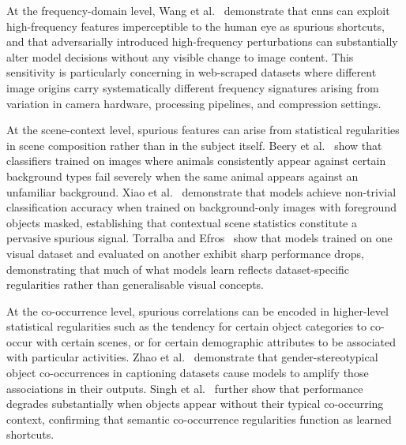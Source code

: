 At the frequency-domain level, Wang et al.~\cite{Wang_2020_HighFrequencyComponentHelpsExplainTheGeneralizationOfCNN} demonstrate that \acrshort{cnn}s can exploit high-frequency features imperceptible to the human eye as spurious shortcuts, and that adversarially introduced high-frequency perturbations can substantially alter model decisions without any visible change to image content. This sensitivity is particularly concerning in web-scraped datasets where different image origins carry systematically different frequency signatures arising from variation in camera hardware, processing pipelines, and compression settings.

At the scene-context level, spurious features can arise from statistical
regularities in scene composition rather than in the subject itself. Beery et
al.~\cite{Beery_2018_RecognitionTerraIncognita} show that classifiers trained on images
where animals consistently appear against certain background types fail severely when the
same animal appears against an unfamiliar background. Xiao et
al.~\cite{Xiao_2021_NoiseOrSignal} demonstrate that models achieve non-trivial
classification accuracy when trained on background-only images with foreground objects
masked, establishing that contextual scene statistics constitute a pervasive spurious
signal. Torralba and Efros~\cite{Torralba_2011_UnbiasedLookDatasetBias} show that models
trained on one visual dataset and evaluated on another exhibit sharp performance drops,
demonstrating that much of what models learn reflects dataset-specific regularities rather
than generalisable visual concepts.

At the co-occurrence level, spurious correlations can be encoded in
higher-level statistical regularities such as the tendency for certain object categories
to co-occur with certain scenes, or for certain demographic attributes to be associated
with particular activities. Zhao et al.~\cite{Zhao_2017_MenAlsoLikeShopping} demonstrate
that gender-stereotypical object co-occurrences in captioning datasets cause models to
amplify those associations in their outputs. Singh et
al.~\cite{Singh_2020_DontJudgeObjectContext} further show that performance degrades
substantially when objects appear without their typical co-occurring context, confirming
that semantic co-occurrence regularities function as learned shortcuts.

